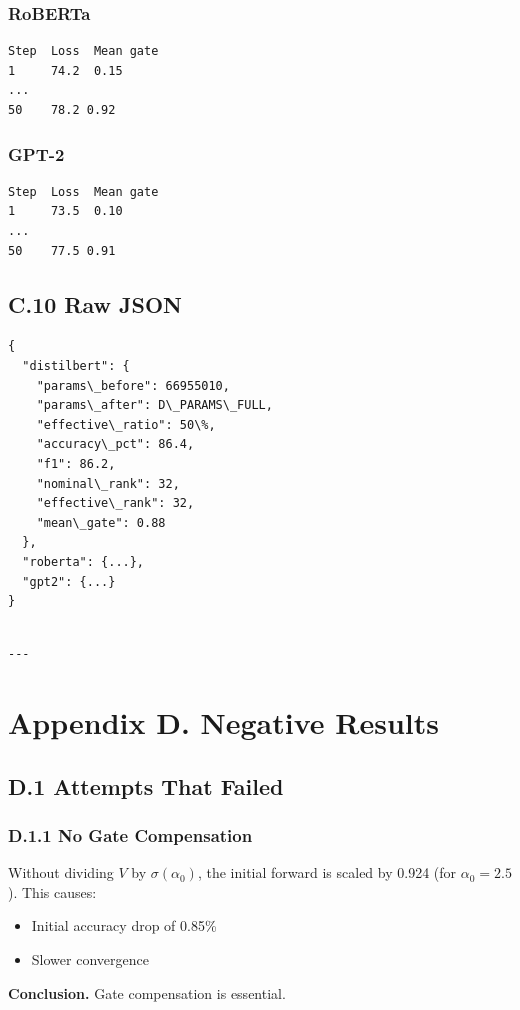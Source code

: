 \subsubsection{RoBERTa}
\begin{lstlisting}
Step  Loss  Mean gate
1     74.2  0.15
...
50    78.2 0.92
\end{lstlisting}

\subsubsection{GPT-2}
\begin{lstlisting}
Step  Loss  Mean gate
1     73.5  0.10
...
50    77.5 0.91
\end{lstlisting}

\subsection{C.10 Raw JSON}

\begin{lstlisting}
{
  "distilbert": {
    "params\_before": 66955010,
    "params\_after": D\_PARAMS\_FULL,
    "effective\_ratio": 50\%,
    "accuracy\_pct": 86.4,
    "f1": 86.2,
    "nominal\_rank": 32,
    "effective\_rank": 32,
    "mean\_gate": 0.88
  },
  "roberta": {...},
  "gpt2": {...}
}
\end{lstlisting}
\begin{lstlisting}

---
\end{lstlisting}


\section{Appendix D. Negative Results}

\subsection{D.1 Attempts That Failed}

\subsubsection{D.1.1 No Gate Compensation}

Without dividing $V$ by $\sigma(\alpha_0)$, the initial forward is scaled 
by 0.924 (for $\alpha_0 = 2.5$). This causes:
\begin{itemize}
\item Initial accuracy drop of 0.85\%
\item Slower convergence

\end{itemize}
\textbf{Conclusion.} Gate compensation is essential.

